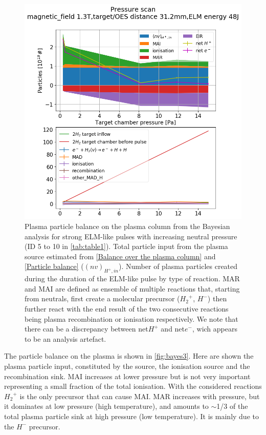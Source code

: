 \begin{figure}[!ht]
        \centering
    	\includegraphics[width=0.7\linewidth,trim={30 260 60 60},clip]{Chapters/chapter3/figs/bayesian_strong_6.png}
	\caption{Plasma particle balance on the plasma column from the Bayesian analysis for strong ELM-like pulses with increasing neutral pressure (ID 5 to 10 in \autoref{tab:table1}). Total particle input from the plasma source estimated from \autoref{Balance over the plasma column} and \ref{Particle balance} ($(nv)_{H^+,in}$). Number of plasma particles created during the duration of the ELM-like pulse by type of reaction. MAR and MAI are defined as ensemble of multiple reactions that, starting from neutrals, first create a molecular precursor (${H_2}^+$, $H^-$) then further react with the end result of the two consecutive reactions being plasma recombination or ionisation respectively.\cite{Verhaegh2020} We note that there can be a discrepancy between net$H^+$ and net$e^-$, wich appears to be an analysis artefact.}
	\label{fig:bayes3}
\end{figure}
The particle balance on the plasma is shown in \autoref{fig:bayes3}.
Here are shown the plasma particle input, constituted by the source, the ionisation source and the recombination sink. MAI increases at lower pressure but is not very important representing a small fraction of the total ionisation. With the considered reactions ${H_2}^+$ is the only precursor that can cause MAI. MAR increases with pressure, but it dominates at low pressure (high temperature), and amounts to $\sim$1/3 of the total plasma particle sink at high pressure (low temperature). It is mainly due to the $H^-$ precursor. 

